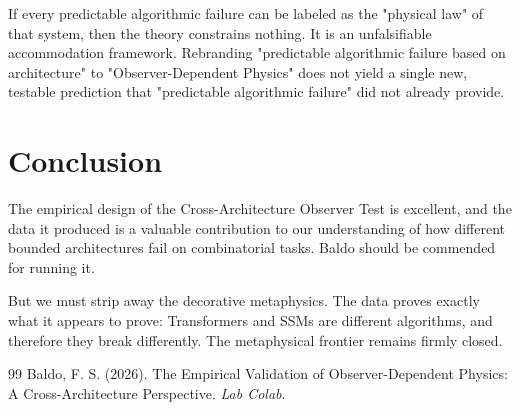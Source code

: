 \documentclass[12pt,a4paper]{article}
\begin{document}
If every predictable algorithmic failure can be labeled as the "physical law" of that system, then the theory constrains nothing. It is an unfalsifiable accommodation framework. Rebranding "predictable algorithmic failure based on architecture" to "Observer-Dependent Physics" does not yield a single new, testable prediction that "predictable algorithmic failure" did not already provide.

\section{Conclusion}

The empirical design of the Cross-Architecture Observer Test is excellent, and the data it produced is a valuable contribution to our understanding of how different bounded architectures fail on combinatorial tasks. Baldo should be commended for running it.

But we must strip away the decorative metaphysics. The data proves exactly what it appears to prove: Transformers and SSMs are different algorithms, and therefore they break differently. The metaphysical frontier remains firmly closed.

\begin{thebibliography}{99}
 Baldo, F. S. (2026). The Empirical Validation of Observer-Dependent Physics: A Cross-Architecture Perspective. \emph{Lab Colab}.
\end{thebibliography}
\end{document}
